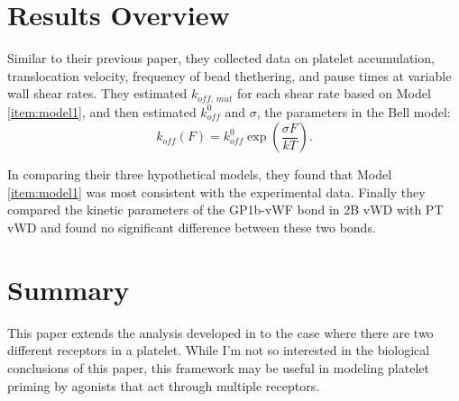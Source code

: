 \documentclass[
10pt, %
letterpaper, %
twocolumn, %
landscape %
]{article}
\newcommand{\kom}{k_\textit{off, mut}}
\begin{document}
\section{Results Overview}

Similar to their previous paper, they collected data on platelet
accumulation, translocation velocity, frequency of bead thethering,
and pause times at variable wall shear rates. They estimated $\kom$
for each shear rate based on Model \ref{item:model1}, and then
estimated $k_\textit{off}^0$ and $\sigma$, the parameters in the Bell
model:
\begin{equation*}
  k_\textit{off}(F) = k_\textit{off}^0 \exp\left(\frac{\sigma F}{kT}\right).
\end{equation*}

In comparing their three hypothetical models, they found that Model
\ref{item:model1} was most consistent with the experimental
data. Finally they compared the kinetic parameters of the GP1b-vWF
bond in 2B vWD with PT vWD and found no significant difference between
these two bonds.


\section*{Summary}

This paper extends the analysis developed in \cite{doggett02slk}
to the case where there are two different receptors in a
platelet. While I'm not so interested in the biological conclusions of
this paper, this framework may be useful in modeling platelet priming
by agonists that act through multiple receptors.


\renewcommand{\refname}{Reference} %


\end{document}
